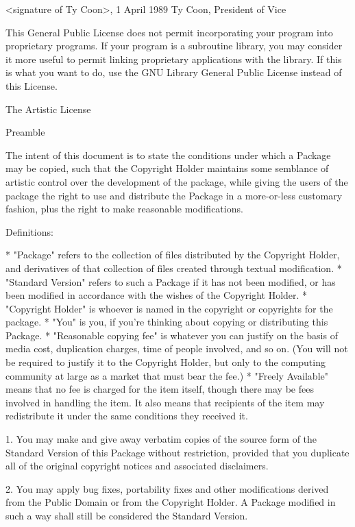 \documentclass{doc}
\begin{document}
  <signature of Ty Coon>, 1 April 1989
  Ty Coon, President of Vice

This General Public License does not permit incorporating your program into
proprietary programs.  If your program is a subroutine library, you may
consider it more useful to permit linking proprietary applications with the
library.  If this is what you want to do, use the GNU Library General
Public License instead of this License.



The Artistic License

Preamble

The intent of this document is to state the conditions under which a Package may be
copied, such that the Copyright Holder maintains some semblance of artistic control over
the development of the package, while giving the users of the package the right to use and
distribute the Package in a more-or-less customary fashion, plus the right to make
reasonable modifications.

Definitions:

*	"Package" refers to the collection of files distributed by the Copyright Holder, and
derivatives of that collection of files created through textual modification.
*	"Standard Version" refers to such a Package if it has not been modified, or has been
modified in accordance with the wishes of the Copyright Holder.
*	"Copyright Holder" is whoever is named in the copyright or copyrights for the
package.
*	"You" is you, if you're thinking about copying or distributing this Package.
*	"Reasonable copying fee" is whatever you can justify on the basis of media cost,
duplication charges, time of people involved, and so on. (You will not be required to
justify it to the Copyright Holder, but only to the computing community at large as a
market that must bear the fee.)
*	"Freely Available" means that no fee is charged for the item itself, though there may
be fees involved in handling the item. It also means that recipients of the item may
redistribute it under the same conditions they received it.


1. You may make and give away verbatim copies of the source form of the Standard Version
of this Package without restriction, provided that you duplicate all of the original
copyright notices and associated disclaimers.

2. You may apply bug fixes, portability fixes and other modifications derived from the
Public Domain or from the Copyright Holder. A Package modified in such a way shall still
be considered the Standard Version.
\end{document}
